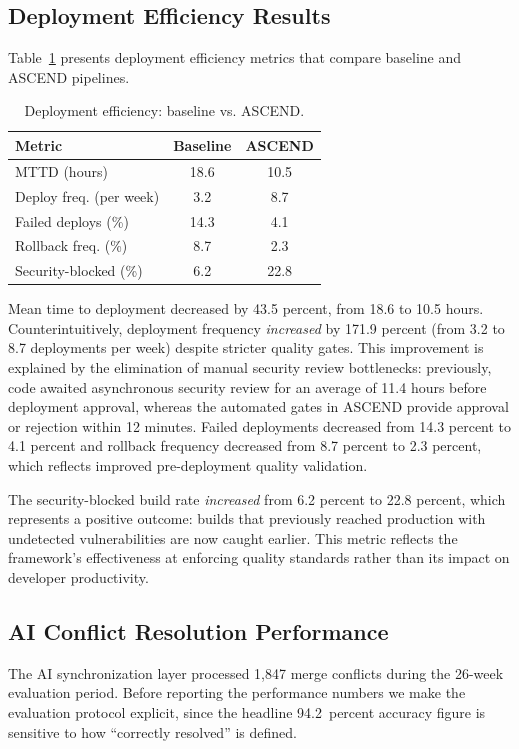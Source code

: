 \documentclass{ieeeaccess}
\begin{document}
\subsection{Deployment Efficiency Results}
Table~\ref{tab:deploy} presents deployment efficiency metrics that compare baseline and ASCEND pipelines.

\begin{table}[!t]
\caption{Deployment efficiency: baseline vs. ASCEND.}
\label{tab:deploy}
\centering
\begin{tabular}{lcc}
\hline
\textbf{Metric} & \textbf{Baseline} & \textbf{ASCEND} \\
\hline
MTTD (hours)                  & 18.6 & 10.5 \\
Deploy freq. (per week)       & 3.2  & 8.7  \\
Failed deploys (\%)           & 14.3 & 4.1  \\
Rollback freq. (\%)           & 8.7  & 2.3  \\
Security-blocked (\%)         & 6.2  & 22.8 \\
\hline
\end{tabular}
\end{table}

Mean time to deployment decreased by 43.5 percent, from 18.6 to 10.5 hours. Counterintuitively, deployment frequency \emph{increased} by 171.9 percent (from 3.2 to 8.7 deployments per week) despite stricter quality gates. This improvement is explained by the elimination of manual security review bottlenecks: previously, code awaited asynchronous security review for an average of 11.4 hours before deployment approval, whereas the automated gates in ASCEND provide approval or rejection within 12 minutes. Failed deployments decreased from 14.3 percent to 4.1 percent and rollback frequency decreased from 8.7 percent to 2.3 percent, which reflects improved pre-deployment quality validation.

The security-blocked build rate \emph{increased} from 6.2 percent to 22.8 percent, which represents a positive outcome: builds that previously reached production with undetected vulnerabilities are now caught earlier. This metric reflects the framework's effectiveness at enforcing quality standards rather than its impact on developer productivity.

\subsection{AI Conflict Resolution Performance}
The AI synchronization layer processed 1{,}847 merge conflicts during the 26-week evaluation period. Before reporting the performance numbers we make the evaluation protocol explicit, since the headline 94.2~percent accuracy figure is sensitive to how ``correctly resolved'' is defined.
\end{document}
